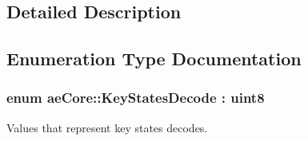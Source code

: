 

\subsection{Detailed Description}


\subsection{Enumeration Type Documentation}
\subsubsection[{\texorpdfstring{Key\+States\+Decode}{KeyStatesDecode}}]{\setlength{\rightskip}{0pt plus 5cm}enum {\bf ae\+Core\+::\+Key\+States\+Decode} \+: {\bf uint8}\hspace{0.3cm}{\ttfamily [strong]}}\hypertarget{namespaceae_core_aa7afae6827a908a9adc5250cf17d52cb}{}\label{namespaceae_core_aa7afae6827a908a9adc5250cf17d52cb}


Values that represent key states decodes. 

